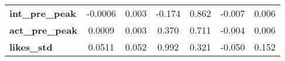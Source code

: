 \begin{center}
\begin{tabular}{lcccccc}
\textbf{int\_pre\_peak} &      -0.0006  &        0.003     &    -0.174  &         0.862        &       -0.007    &        0.006     \\
\textbf{act\_pre\_peak} &       0.0009  &        0.003     &     0.370  &         0.711        &       -0.004    &        0.006     \\
\textbf{likes\_std}     &       0.0511  &        0.052     &     0.992  &         0.321        &       -0.050    &        0.152     \\
\bottomrule
\end{tabular}
\end{center}